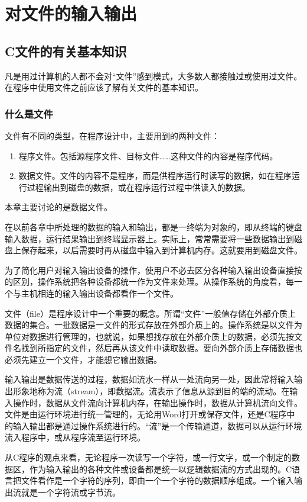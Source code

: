 \chapter{对文件的输入输出}
\section{C文件的有关基本知识}
凡是用过计算机的人都不会对“文件”感到模式，大多数人都接触过或使用过文件。在程序中使用文件之前应该了解有关文件的基本知识。
\subsection{什么是文件}
文件有不同的类型，在程序设计中，主要用到的两种文件：
\begin{enumerate}
	\item 程序文件。包括源程序文件、目标文件……这种文件的内容是程序代码。
	\item 数据文件。文件的内容不是程序，而是供程序运行时读写的数据，如在程序运行过程输出到磁盘的数据，或在程序运行过程中供读入的数据。
\end{enumerate}
本章主要讨论的是数据文件。

在以前各章中所处理的数据的输入和输出，都是一终端为对象的，即从终端的键盘输入数据，运行结果输出到终端显示器上。实际上，常常需要将一些数据输出到磁盘上保存起来，以后需要时再从磁盘中输入到计算机内存。这就要用到磁盘文件。

为了简化用户对输入输出设备的操作，使用户不必去区分各种输入输出设备直接按的区别，操作系统把各种设备都统一作为文件来处理。从操作系统的角度看，每一个与主机相连的输入输出设备都看作一个文件。

文件（file）是程序设计中一个重要的概念。所谓“文件”一般值存储在外部介质上数据的集合。一批数据是一文件的形式存放在外部介质上的。操作系统是以文件为单位对数据进行管理的，也就说，如果想找存放在外部介质上的数据，必须先按文件名找到所指定的文件，然后再从该文件中读取数据。要向外部介质上存储数据也必须先建立一个文件，才能想它输出数据。

输入输出是数据传送的过程，数据如流水一样从一处流向另一处，因此常将输入输出形象地称为流（stream），即数据流。流表示了信息从源到目的端的流动。在输入操作时，数据从文件流向计算机内存，在输出操作时，数据从计算机流向文件。文件是由运行环境进行统一管理的，无论用Word打开或保存文件，还是C程序中的输入输出都是通过操作系统进行的。“流”是一个传输通道，数据可以从运行环境流入程序中，或从程序流至运行环境。

从C程序的观点来看，无论程序一次读写一个字符，或一行文字，或一个制定的数据区，作为输入输出的各种文件或设备都是统一以逻辑数据流的方式出现的。C语言把文件看作是一个字符的序列，即由一个一个字符的数据顺序组成。一个输入输出流就是一个字符流或字节流。

